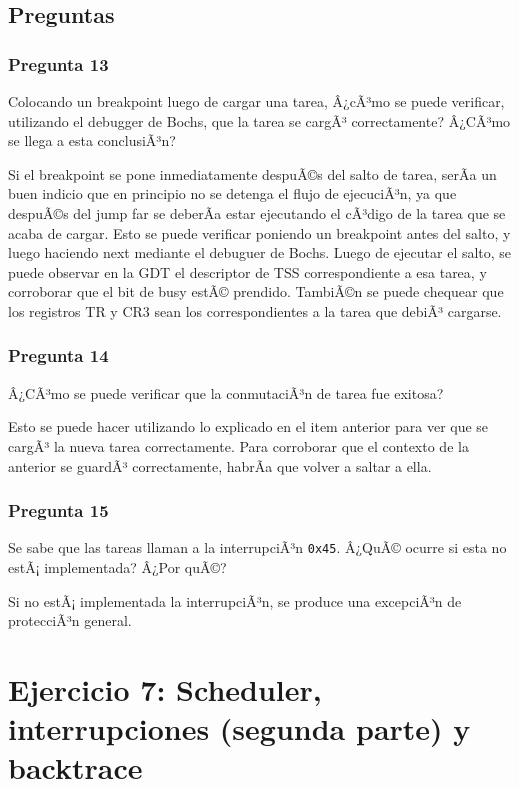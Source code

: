 \documentclass[10pt, a4paper]{article}
\begin{document}
\subsection{Preguntas}
\subsubsection*{Pregunta 13}
 \begin{framed}
Colocando un breakpoint luego de cargar una tarea, Â¿cÃ³mo se puede verificar, utilizando el debugger de Bochs, que la tarea se cargÃ³ correctamente?
Â¿CÃ³mo se llega a esta conclusiÃ³n?
\end{framed}
Si el breakpoint se pone inmediatamente despuÃ©s del salto de tarea, serÃ­a un buen indicio que en principio no se detenga el flujo de ejecuciÃ³n, ya que
despuÃ©s del jump far se deberÃ­a estar ejecutando el cÃ³digo de la tarea que se acaba de cargar. Esto se puede verificar poniendo un breakpoint antes del salto, y luego 
haciendo  next mediante el debuguer de Bochs. Luego de ejecutar el salto, se puede observar en la GDT el descriptor de TSS correspondiente a esa tarea, y corroborar
que el bit de busy estÃ© prendido. TambiÃ©n se puede chequear que los registros TR y CR3 sean los correspondientes a la tarea que debiÃ³ cargarse.
\subsubsection*{Pregunta 14}
 \begin{framed}
Â¿CÃ³mo se puede verificar que la conmutaciÃ³n de tarea fue exitosa?
\end{framed}
Esto se puede hacer utilizando lo explicado en el item anterior para ver que se cargÃ³ la nueva tarea correctamente. Para corroborar que el contexto de la anterior se guardÃ³ correctamente, habrÃ­a que volver a saltar a ella.

\subsubsection*{Pregunta 15}
 \begin{framed}
Se sabe que las tareas llaman a la interrupciÃ³n \texttt{0x45}. Â¿QuÃ© ocurre si esta no estÃ¡ implementada? Â¿Por quÃ©?
\end{framed}
Si no estÃ¡ implementada la interrupciÃ³n, se produce una excepciÃ³n de protecciÃ³n general.
\section{Ejercicio 7: Scheduler, interrupciones (segunda parte) y backtrace}
\end{document}
